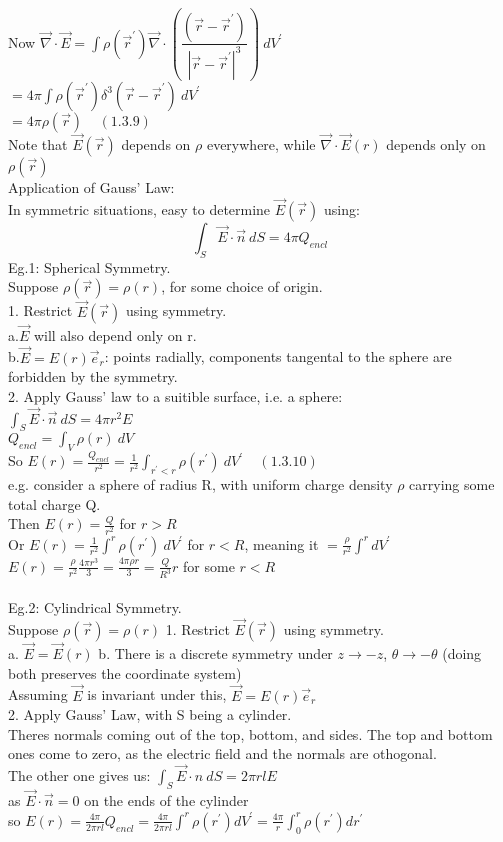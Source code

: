 \documentclass[a4paper,11pt]{article}
\begin{document}
Now $\vec{\nabla} \cdot \vec{E} = \int \rho(\vec{r}^{'}) \vec{\nabla} \cdot (\dfrac{(\vec{r}-\vec{r}^{'})}{|\vec{r} - \vec{r} ^{'}|^3})~dV^{'}$\\
$=4\pi \int \rho(\vec{r}^{'}) \delta ^3 (\vec{r} - \vec{r}^{'})~dV^{'}$\\
$=4\pi \rho(\vec{r})~~~~~(1.3.9)$\\
Note that $\vec{E}(\vec{r})$ depends on $\rho$ everywhere, while $\vec{\nabla} \cdot \vec{E}(r)$ depends only on $\rho(\vec{r})$\\
Application of Gauss' Law:\\
In symmetric situations, easy to determine $\vec{E}(\vec{r})$ using:
$$\int_S \vec{E}\cdot \vec{n} ~dS=4\pi Q_{encl}$$
Eg.1: Spherical Symmetry.\\
Suppose $\rho (\vec{r})=\rho(r)$, for some choice of origin.\\
1. Restrict $\vec{E}(\vec{r})$ using symmetry.\\
a.$\vec{E}$ will also depend only on r.\\
b.$\vec{E}=E(r)\vec{e}_r$: points radially, components tangental to the sphere are forbidden by the symmetry.\\
2. Apply Gauss' law to a suitible surface, i.e. a sphere:\\
$\int_S \vec{E}\cdot \vec{n} ~dS = 4\pi r^2 E$\\
$Q_{encl} = \int _V \rho (r) ~dV$\\
So $E(r) = \frac{Q_{encl}}{r^2} = \frac{1}{r^2} \int_{r^{'} < r} \rho(r^{'})~dV^{'} ~~~~~(1.3.10)$\\
e.g. consider a sphere of radius R, with uniform charge density $\rho$ carrying some total charge Q.\\
Then $E(r)= \frac{Q}{r^2}$ for $r>R$\\
Or $E(r) = \frac{1}{r^2} \int^r \rho(r^{'})~dV^{'}$ for $r<R$, meaning it $= \frac{\rho}{r^2} \int ^r dV^{'}$\\
$E(r)=\frac{\rho}{r^2}\frac{4\pi r^3}{3}=\frac{4\pi \rho r}{3}=\frac{Q}{R^3}r$ for some $r<R$\\
\\
Eg.2: Cylindrical Symmetry.\\
Suppose $\rho (\vec{r})=\rho(r)$
1. Restrict $\vec{E}(\vec{r})$ using symmetry.\\
a. $\vec{E}=\vec{E}(r)$
b. There is a discrete symmetry under $z \rightarrow -z$, $\theta \rightarrow -\theta$ (doing both preserves the coordinate system)\\
Assuming $\vec{E}$ is invariant under this, $\vec{E}=E(r)\vec{e}_r$\\
2. Apply Gauss' Law, with S being a cylinder.\\
Theres normals coming out of the top, bottom, and sides. The top and bottom ones come to zero, as the electric field and the normals are othogonal.\\
The other one gives us: $\int_S \vec{E}\cdot {n} ~dS=2\pi r l E$\\ 
as $\vec{E}\cdot\vec{n} = 0$ on the ends of the cylinder\\
so $E(r)= \frac{4\pi}{2\pi r l}Q_{encl} = \frac{4\pi}{2\pi rl} \int ^r \rho(r^{'}) dV^{'} = \frac{4\pi}{r}\int^r _0 \rho(r^{'}) dr^{'}$\\
\end{document}
